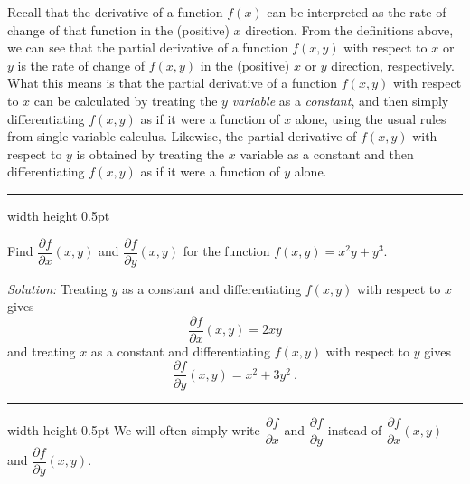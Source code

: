 
Recall that the derivative of a function $f(x)$ can be interpreted as the rate of change of that function in the
(positive) $x$ direction. From the definitions above, we can see that the partial derivative of a function
$f(x,y)$ with respect to $x$ or $y$ is the rate of change of $f(x,y)$ in the (positive) $x$ or $y$ direction,
respectively. What this means is that the partial derivative of a function $f(x,y)$ with respect to $x$ can be
calculated by treating the $y$ \emph{variable} as a \emph{constant}, and then simply differentiating $f(x,y)$ as if it
were a function of $x$ alone, using the usual rules from single-variable calculus. Likewise, the partial derivative of
$f(x,y)$ with respect to $y$ is obtained by treating the $x$ variable as a constant and then differentiating $f(x,y)$
as if it were a function of $y$ alone.

\vspace{4mm}
\hrule width \textwidth height 0.5pt
\begin{exmp}
 Find $\dfrac{\partial f}{\partial x} (x,y)$ and $\dfrac{\partial f}{\partial y} (x,y)$ for the function
 $f(x,y) = x^{2}y + y^3$.\vspace{1mm}
 \par\noindent\emph{Solution:} Treating $y$ as a constant and differentiating $f(x,y)$ with respect to $x$ gives
 \begin{displaymath}
  \dfrac{\partial f}{\partial x} (x,y) = 2xy
 \end{displaymath}
 and treating $x$ as a constant and differentiating $f(x,y)$ with respect to $y$ gives
 \begin{displaymath}
  \dfrac{\partial f}{\partial y} (x,y) = x^2 + 3y^2 ~.
 \end{displaymath}
\end{exmp}
\hrule width \textwidth height 0.5pt
\newpage
We will often simply write $\dfrac{\partial f}{\partial x}$ and $\dfrac{\partial f}{\partial y}$ instead of
$\dfrac{\partial f}{\partial x} (x,y)$ and $\dfrac{\partial f}{\partial y} (x,y)$.

